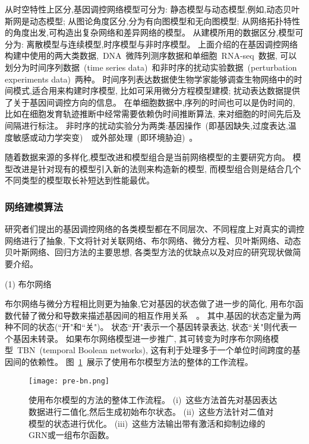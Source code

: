 从时空特性上区分,基因调控网络模型可分为:
静态模型与动态模型,例如,动态贝叶斯网是动态模型;
从图论角度区分,分为有向图模型和无向图模型;
从网络拓扑特性的角度出发,可构造出复杂网络和差异网络的模型。 
从建模所用的数据区分,模型可分为:
离散模型与连续模型,时序模型与非时序模型。
上面介绍的在基因调控网络构建中使用的两大类数据,~DNA~微阵列测序数据和单细胞~RNA-seq~数据, 
可以划分为时间序列数据~(time series data)~和非时序的扰动实验数据~(perturbation experiments data)~两种。
时间序列表达数据使生物学家能够调查生物网络中的时间模式,适合用来构建时序模型, 比如可采用微分方程模型建模; 
扰动表达数据提供了关于基因间调控方向的信息。
在单细胞数据中,序列的时间也可以是伪时间的, 比如在细胞发育轨迹推断中经常需要依赖伪时间推断算法, 来对细胞的时间先后及间隔进行标注。
非时序的扰动实验分为两类:基因操作~(即基因缺失,过度表达,温度敏感或动力学突变)~\cite{holstege1998dissecting}~或外部处理~(即环境胁迫)~\cite{gasch2000genomic}。

随着数据来源的多样化,模型改进和模型组合是当前网络模型的主要研究方向。
模型改进是针对现有的模型引入新的法则来构造新的模型,
而模型组合则是结合几个不同类型的模型取长补短达到性能最优。

\subsubsection{网络建模算法}
研究者们提出的基因调控网络的各类模型都在不同层次、不同程度上对真实的调控网络进行了抽象,
下文将针对关联网络、布尔网络、微分方程、贝叶斯网络、动态贝叶斯网络、回归方法的主要思想,
各类型方法的优缺点以及对应的研究现状做简要介绍。

(1) 布尔网络

布尔网络与微分方程相比则更为抽象,它对基因的状态做了进一步的简化,
用布尔函数代替了微分和导数来描述基因间的相互作用关系~\cite{shmulevich2002probabilistic,kim2007boolean,bornholdt2008boolean,zhou2016relative}~。
其中,基因的状态定量为两种不同的状态(``开"和``关")。
状态``开"表示一个基因转录表达, 状态``关"则代表一个基因未转录。
如果布尔网络模型进一步推广, 其可转变为时序布尔网络模型~TBN~(temporal Boolean networks), 这有利于处理多于一个单位时间跨度的基因间的依赖性。
图~\ref{fig:pre-bn}~展示了使用布尔模型方法的整体的工作流程。
\begin{figure}[!htbp]
    \centering
    \texttt{[image: pre-bn.png]}
    \caption{
        使用布尔模型的方法的整体工作流程。
        (i)~这些方法首先对基因表达数据进行二值化,然后生成初始布尔状态。
        (ii)~这些方法针对二值对模型的状态进行优化。
        (iii)~这些方法输出带有激活和抑制边缘的GRN或一组布尔函数。
    }
    \label{fig:pre-bn}
\end{figure}

